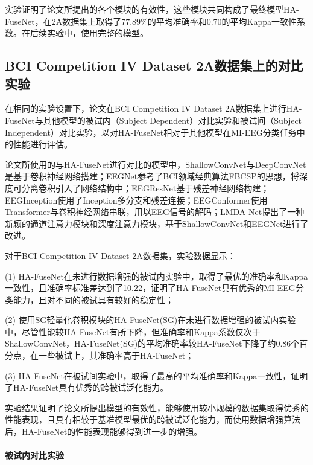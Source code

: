 实验证明了论文所提出的各个模块的有效性，这些模块共同构成了最终模型HA-FuseNet，在2A数据集上取得了77.89\%的平均准确率和0.70的平均Kappa一致性系数。在后续实验中，使用完整的模型。

\subsection{BCI Competition IV Dataset 2A数据集上的对比实验}

在相同的实验设置下，论文在BCI Competition IV Dataset 2A数据集上进行HA-FuseNet与其他模型的被试内（Subject Dependent）对比实验和被试间（Subject Independent）对比实验，以对HA-FuseNet相对于其他模型在MI-EEG分类任务中的性能进行评估。

论文所使用的与HA-FuseNet进行对比的模型中，ShallowConvNet\cite{schirrmeister2017deep}与DeepConvNet\cite{schirrmeister2017deep}是基于卷积神经网络搭建；EEGNet\cite{lawhern2018eegnet}参考了BCI领域经典算法FBCSP的思想，将深度可分离卷积引入了网络结构中；EEGResNet\cite{HBM:HBM23730}基于残差神经网络\cite{he2016deep}构建；EEGInception\cite{zhang2021eeg}使用了Inception多分支和残差连接；EEGConformer\cite{song2022eeg}使用Transformer\cite{vaswani2017attention}与卷积神经网络串联，用以EEG信号的解码；LMDA-Net\cite{miao2023lmda}提出了一种新颖的通道注意力模块和深度注意力模块，基于ShallowConvNet和EEGNet进行了改进。

对于BCI Competition IV Dataset 2A数据集，实验数据显示：

(1) HA-FuseNet在未进行数据增强的被试内实验中，取得了最优的准确率和Kappa一致性，且准确率标准差达到了10.22，证明了HA-FuseNet具有优秀的MI-EEG分类能力，且对不同的被试具有较好的稳定性；

(2) 使用SG轻量化卷积模块的HA-FuseNet(SG)在未进行数据增强的被试内实验中，尽管性能较HA-FuseNet有所下降，但准确率和Kappa系数仅次于ShallowConvNet，HA-FuseNet(SG)的平均准确率较HA-FuseNet下降了约0.86个百分点，在一些被试上，其准确率高于HA-FuseNet；

(3) HA-FuseNet在被试间实验中，取得了最高的平均准确率和Kappa一致性，证明了HA-FuseNet具有优秀的跨被试泛化能力。

实验结果证明了论文所提出模型的有效性，能够使用较小规模的数据集取得优秀的性能表现，且具有相较于基准模型最优的跨被试泛化能力，而使用数据增强算法后，HA-FuseNet的性能表现能够得到进一步的增强。

\paragraph{被试内对比实验}

